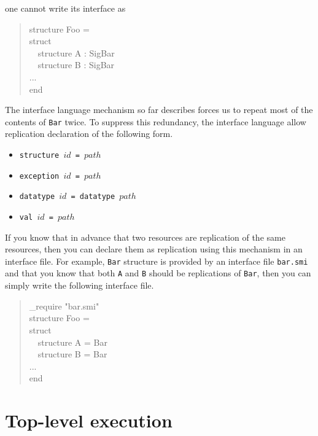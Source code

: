 \documentclass{jbook}
\newcommand{\txt}[2]{#2}
\newcommand{\myem}{\mbox{\ \ }}
\newenvironment{program}{\begin{quote}\begin{tt}}%
                        {\end{tt}\end{quote}}
\begin{document}
one cannot write its interface as
\begin{program}
structure Foo = \\
struct\\
\myem structure A : SigBar\\
\myem structure B : SigBar\\
...\\
end
\end{program}
	The interface language mechanism so far describes forces us to
repeat most of the contents of {\tt Bar} twice.
	To suppress this redundancy, the interface language allow
replication declaration of the following form.
\begin{itemize}
\item {\tt structure $id$ =  $path$}
\item {\tt exception $id$ = $path$}
\item {\tt datatype $id$ = datatype $path$}
\item {\tt val $id$ = $path$}
\end{itemize}
	If you know that in advance that two resources are replication of
the same resources, then you can declare them as replication using this
mechanism in an interface file.
	For example, {\tt Bar} structure is provided by an interface
file {\tt bar.smi} and that you know that both {\tt A} and {\tt B}
should be replications of {\tt Bar}, then you can simply write the
following interface file.
\begin{program}
\_require "bar.smi"\\
structure Foo = \\
struct\\
\myem structure A = Bar\\
\myem structure B = Bar\\
...\\
end
\end{program}
\fi%

\section{\txt{トップレベルの実行}{Top-level execution}}
\end{document}
